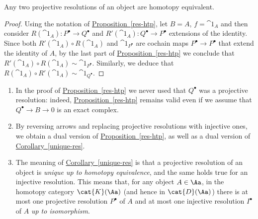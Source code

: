 \begin{cor}\label{unique-res}
    Any two projective resolutions of an object are homotopy equivalent.
    \begin{proof}
        Using the notation of \hyperref[res-htp]{Proposition~\ref*{res-htp}},
        let $B=A$, $f = \cat{1}_{A}$ and then consider 
        $R(\cat{1}_{A}) : P^{\bullet} \to Q^{\bullet}$
        and $R'(\cat{1}_{A}) : Q^{\bullet} \to P^{\bullet}$
        extensions of the identity. 
        Since both $R'(\cat{1}_{A}) \circ R(\cat{1}_{A})$
        and $\cat{1}_{P^{\bullet}}$ are cochain maps
        $P^{\bullet} \to P^{\bullet}$ that extend the identity of $A$,
        by the last part of \hyperref[res-htp]{Proposition~\ref*{res-htp}}
        we conclude that 
        $R'(\cat{1}_{A}) \circ R(\cat{1}_{A}) \sim \cat{1}_{P^{\bullet}}$.
        Similarly, we deduce that $R(\cat{1}_{A}) \circ R'(\cat{1}_{A}) \sim \cat{1}_{Q^{\bullet}}$.
    \end{proof}
\end{cor}

\begin{rmk}
    \begin{enumerate}
        \item In the proof of \hyperref[res-htp]{Proposition~\ref*{res-htp}}
        we never used that $Q^{\bullet}$ was a projective resolution: indeed,
        \hyperref[res-htp]{Proposition~\ref*{res-htp}} remains valid even if
        we assume that $Q^{\bullet} \to B \to 0$ is an exact complex.

        \item By reversing arrows and replacing projective resolutions with
        injective ones, we obtain a dual version of 
        \hyperref[res-htp]{Proposition~\ref*{res-htp}}, 
        as well as a dual version of \hyperref[unique-res]{Corollary~\ref*{unique-res}}.

        \item The meaning of \hyperref[unique-res]{Corollary~\ref*{unique-res}}
        is that a projective resolution of an object is 
        \emph{unique up to homotopy equivalence}, 
        and the same holds true for an injective resolution.
        This means that, for any object $A \in \Aa$, 
        in the homotopy category $\cat{K}(\Aa)$ (and hence in $\cat{D}(\Aa)$)
        there is at most
        one projective resolution $P^{\bullet}$ of $A$
        and at most one injective resolution $I^{\bullet}$ of $A$
        \emph{up to isomorphism}.
    \end{enumerate}
\end{rmk}

